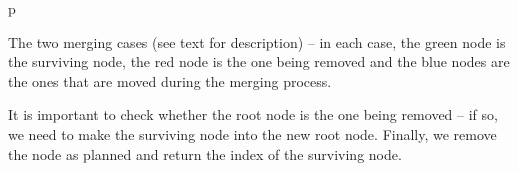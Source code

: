 \begin{stusubfig}{p}
	\hspace{4mm}%
\caption{The two merging cases (see text for description) -- in each case, the green node is the surviving node, the red node is the one being removed and the blue nodes are the ones that are moved during the merging process.}
\label{fig:appendixds-mst-mergecases}
\end{stusubfig}

It is important to check whether the root node is the one being removed -- if so, we need to make the surviving node into the new root node. Finally, we remove the node as planned and return the index of the surviving node.

